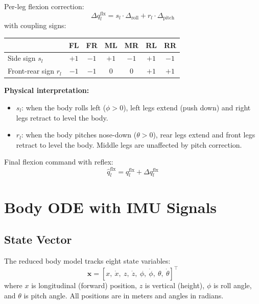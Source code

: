 \documentclass[11pt]{article}
\begin{document}
Per-leg flexion correction:
\begin{equation}
\Delta q_l^{\mathrm{flx}} = s_l \cdot \Delta_{\mathrm{roll}} + r_l \cdot \Delta_{\mathrm{pitch}}
\label{eq:reflex-per-leg}
\end{equation}
with coupling signs:

\begin{center}
\begin{tabular}{lcccccc}
\toprule
& FL & FR & ML & MR & RL & RR \\
\midrule
Side sign $s_l$ & $+1$ & $-1$ & $+1$ & $-1$ & $+1$ & $-1$ \\
Front-rear sign $r_l$ & $-1$ & $-1$ & $0$ & $0$ & $+1$ & $+1$ \\
\bottomrule
\end{tabular}
\end{center}

\textbf{Physical interpretation:}
\begin{itemize}
    \item $s_l$: when the body rolls left ($\phi>0$), left legs extend (push down) and right legs retract to level the body.
    \item $r_l$: when the body pitches nose-down ($\theta>0$), rear legs extend and front legs retract to level the body. Middle legs are unaffected by pitch correction.
\end{itemize}

Final flexion command with reflex:
\begin{equation}
\hat{q}_l^{\mathrm{flx}} = q_l^{\mathrm{flx}} + \Delta q_l^{\mathrm{flx}}
\label{eq:final-flx}
\end{equation}

\section{Body ODE with IMU Signals}
\label{sec:body-ode}

\subsection{State Vector}

The reduced body model tracks eight state variables:
\begin{equation}
\mathbf{x} = [x,\ \dot{x},\ z,\ \dot{z},\ \phi,\ \dot\phi,\ \theta,\ \dot\theta]^\top
\label{eq:state}
\end{equation}
where $x$ is longitudinal (forward) position, $z$ is vertical (height), $\phi$ is roll angle, and $\theta$ is pitch angle. All positions are in meters and angles in radians.
\end{document}
